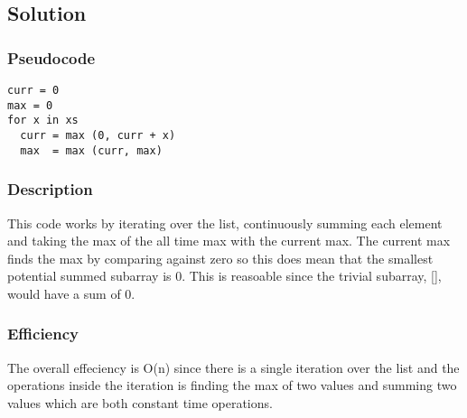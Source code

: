 \subsection*{Solution}

\subsubsection*{Pseudocode}
\begin{verbatim}
curr = 0
max = 0
for x in xs
  curr = max (0, curr + x)
  max  = max (curr, max)
\end{verbatim}

\subsubsection*{Description}
This code works by iterating over the list, continuously summing each element and taking the max of the all time max with the current max. The current max finds the max by comparing against zero so this does mean that the smallest potential summed subarray is 0. This is reasoable since the trivial subarray, [], would have a sum of 0.

\subsubsection*{Efficiency}

The overall effeciency is O(n) since there is a single iteration over the list and the operations inside the iteration is finding the max of two values and summing two values which are both constant time operations.
